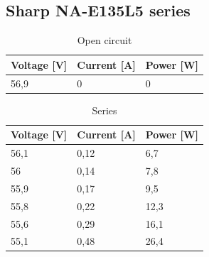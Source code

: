 \documentclass[12pt]{article}
\begin{document}
\subsection{Sharp NA-E135L5 series}
\begin{table}[!h]
	\centering
	\begin{tabular}{|p{2cm}|p{2cm}|p{2cm}|}
		\hline
		\rowcolor{RoyalBlue!80} Voltage [V] & Current [A] & Power [W] \\
		\hline
		\rowcolor{Cerulean!70}     56,9     & 0           & 0         \\
		\hline
	\end{tabular}
	\caption{Open circuit}
	\label{tab:my_label}
\end{table}

\begin{table}[!h]
	\centering
	\begin{tabular}{|p{2cm}|p{2cm}|p{2cm}|}
		\hline
		\rowcolor{Green!80} Voltage [V]  & Current [A] & Power [W] \\
		\hline
		\rowcolor{LimeGreen!70}   56,1   & 0,12        & 6,7       \\
		\hline
		\rowcolor{YellowGreen!70}  56    & 0,14        & 7,8       \\
		\hline
		\rowcolor{LimeGreen!70}     55,9 & 0,17        & 9,5       \\
		\hline
		\rowcolor{YellowGreen!70}  55,8  & 0,22        & 12,3      \\
		\hline
		\rowcolor{LimeGreen!70}    55,6  & 0,29        & 16,1      \\
		\hline
		\rowcolor{YellowGreen!70} 55,1   & 0,48        & 26,4      \\
		\hline
	\end{tabular}
	\caption{Series}
	\label{tab:my_label}
\end{table}
\end{document}
